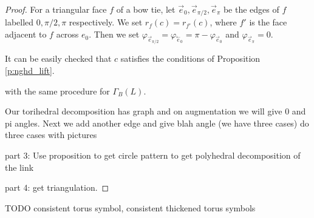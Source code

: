 \documentclass[11pt]{amsart}
\newcommand{\prpref}[1]{Proposition \ref{#1}}
\newcommand{\cev}[1]{\overset{\leftarrow}{#1}}
\newcommand{\vphi}{\varphi}
\theoremstyle{plain}
\theoremstyle{definition}
\begin{document}
\begin{proof}
For a triangular face $f$ of a bow tie,
let $\vec{e}_0, \vec{e}_{\pi/2}, \vec{e}_{\pi}$
be the edges of $f$ labelled $0,\pi/2, \pi$ respectively.
We set $r_f(c) = r_{f'}(c)$,
where $f'$ is the face adjacent to $f$ across $e_0$.
Then we set
$\vphi_{\vec{e}_{\pi/2}} = \vphi_{\cev{e}_0} = \pi - \vphi_{\vec{e}_0}$
and $\vphi_{\vec{e}_{\pi}} = 0$.


It can be easily checked that $c$ satisfies the conditions of
\prpref{p:nghd_lift}.

with the same procedure for $\Gamma_B(L)$.





Our torihedral decomposition has graph and on augmentation we will give 0 and pi angles. Next we add another edge and give blah angle (we have three cases)
do three cases with pictures

part 3: Use proposition to get circle pattern to get polyhedral decomposition of the link 

part 4: get triangulation.  

\end{proof}





TODO consistent torus symbol, consistent thickened torus symbols
\end{document}
